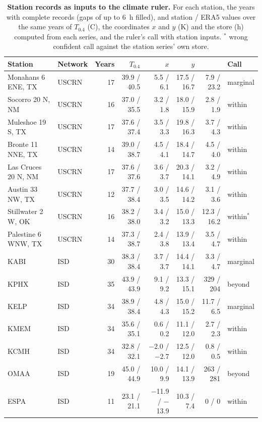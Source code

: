 \begin{table}[htbp]
\centering
\footnotesize
\setlength{\tabcolsep}{3.5pt}
\caption{\textbf{Station records as inputs to the climate ruler.} For each station, the years with complete records (gaps of up to 6~h filled), and station / ERA5 values over the same years of $T_{0.4}$ (\textdegree{}C), the coordinates $x$ and $y$ (K) and the store \hstar{} (h) computed from each series, and the ruler's call with station inputs. $^{\ast}$ wrong confident call against the station series' own store.}\label{tab:s16}
\begin{tabular}{@{}llrrrrrl@{}}
\toprule
Station & Network & Years & $T_{0.4}$ & $x$ & $y$ & \hstar{} & Call\\
\midrule
Monahans 6 ENE, TX & USCRN & 17 & 39.9 / 40.5 & 5.5 / 6.1 & 17.5 / 16.7 & 7.9 / 23.2 & marginal \\
Socorro 20 N, NM & USCRN & 16 & 37.0 / 35.5 & 3.2 / 1.8 & 18.0 / 15.9 & 2.8 / 1.9 & within \\
Muleshoe 19 S, TX & USCRN & 17 & 37.6 / 37.4 & 3.5 / 3.3 & 19.8 / 16.3 & 3.7 / 4.3 & within \\
Bronte 11 NNE, TX & USCRN & 14 & 39.0 / 38.7 & 4.5 / 4.1 & 18.4 / 14.7 & 4.5 / 4.0 & within \\
Las Cruces 20 N, NM & USCRN & 17 & 37.6 / 37.6 & 3.6 / 3.7 & 20.3 / 14.1 & 3.2 / 4.9 & within \\
Austin 33 NW, TX & USCRN & 12 & 37.7 / 38.4 & 3.0 / 3.5 & 14.6 / 14.2 & 3.1 / 3.6 & within \\
Stillwater 2 W, OK & USCRN & 16 & 38.2 / 38.0 & 3.4 / 3.2 & 15.0 / 13.3 & 12.3 / 16.2 & within$^{\ast}$ \\
Palestine 6 WNW, TX & USCRN & 14 & 37.3 / 38.7 & 2.4 / 3.8 & 13.9 / 13.4 & 3.5 / 4.7 & within \\
KABI & ISD & 30 & 38.3 / 38.4 & 3.7 / 3.7 & 14.4 / 14.1 & 3.3 / 4.7 & marginal \\
KPHX & ISD & 35 & 43.9 / 43.9 & 9.1 / 9.2 & 13.3 / 15.1 & 329 / 204 & beyond \\
KELP & ISD & 34 & 38.9 / 38.4 & 4.8 / 4.3 & 15.0 / 15.2 & 11.7 / 6.5 & marginal \\
KMEM & ISD & 34 & 35.6 / 35.1 & 0.6 / 0.2 & 11.1 / 12.0 & 2.7 / 2.3 & within \\
KCMH & ISD & 34 & 32.8 / 32.1 & $-$2.0 / $-$2.7 & 12.5 / 12.0 & 0.8 / 0.5 & within \\
OMAA & ISD & 19 & 45.0 / 44.9 & 10.0 / 9.9 & 14.1 / 13.9 & 263 / 281 & beyond \\
ESPA & ISD & 11 & 23.1 / 21.1 & $-$11.9 / $-$13.9 & 10.3 / 7.4 & 0 / 0 & within \\
\bottomrule
\end{tabular}
\end{table}
